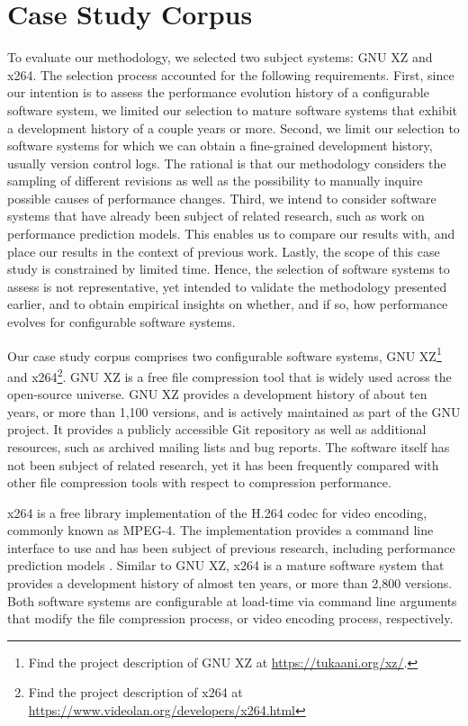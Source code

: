 \section{Case Study Corpus}\label{sec:casestudy}
To evaluate our methodology, we selected two subject systems: GNU XZ and
x264. The selection process accounted for the following requirements. First,
since our intention is to assess the performance evolution history of a
configurable software system, we limited our selection to mature software
systems that exhibit a development history of a couple years or more. Second,
we limit our selection to software systems for which we can obtain a
fine-grained development history, usually version control logs. The rational is that our methodology considers the sampling of different revisions as
well as the possibility to manually inquire possible causes of performance
changes. Third, we intend to consider software systems that have already been
subject of related research, such as work on performance prediction models.
This enables us to compare our results with, and place our results in the
context of previous work. Lastly, the scope of this case study is constrained
by limited time. Hence, the selection of software systems to assess is not
representative, yet intended to validate the methodology presented earlier, and
to obtain empirical insights on whether, and if so, how performance evolves for
configurable software systems.

Our case study corpus comprises two configurable software systems, GNU
XZ\footnote{Find the project description of GNU XZ at
\url{https://tukaani.org/xz/}.} and x264\footnote{Find the project description
of x264 at \url{https://www.videolan.org/developers/x264.html}}.
GNU XZ is a free file compression tool that is widely used across the open-source universe. GNU XZ provides a development history of about ten years,
or more than 1,100 versions,  and is actively maintained as part of the GNU
project. It provides a publicly accessible Git repository as well as additional
resources, such as archived mailing lists and bug reports. The software itself
has not been subject of related research, yet it has been frequently compared
with other file compression tools with respect to compression performance. 

x264 is a free library implementation of the H.264 codec for video encoding,
commonly known as MPEG-4. The implementation provides a command line interface
to use and has been subject of previous research, including performance
prediction models
\citep{siegmund_predicting_2012,siegmund_performance-influence_2015}. Similar to
GNU XZ, x264 is a mature software system that provides a development history of almost ten years, or more than 2,800 versions. Both software systems are configurable at load-time
via command line arguments that modify the file compression process, or video
encoding process, respectively.

